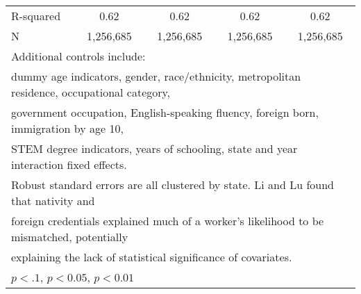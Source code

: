 \begin{table}[htbp]
\begin{tabular}{l*{4}{c}}
R-squared           &        0.62         &        0.62         &        0.62         &        0.62         \\
N                   &   1,256,685         &   1,256,685         &   1,256,685         &   1,256,685         \\
\bottomrule
\multicolumn{5}{l}{\footnotesize Additional controls include:}\\
\multicolumn{5}{l}{\footnotesize dummy age indicators, gender, race/ethnicity, metropolitan residence, occupational category,}\\
\multicolumn{5}{l}{\footnotesize government occupation, English-speaking fluency, foreign born, immigration by age 10,}\\
\multicolumn{5}{l}{\footnotesize STEM degree indicators, years of schooling, state and year interaction fixed effects.}\\
\multicolumn{5}{l}{\footnotesize Robust standard errors are all clustered by state. Li and Lu found that nativity and}\\
\multicolumn{5}{l}{\footnotesize foreign credentials explained much of a worker's likelihood to be mismatched, potentially}\\
\multicolumn{5}{l}{\footnotesize explaining the lack of statistical significance of covariates.}\\
\multicolumn{5}{l}{\footnotesize \sym{*} \(p<.1\), \sym{**} \(p<0.05\), \sym{***} \(p<0.01\)}\\
\end{tabular}
\end{table}
